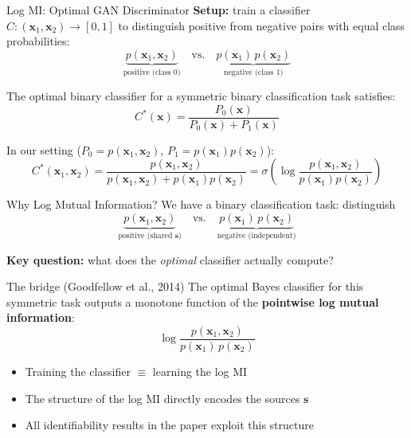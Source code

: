 \documentclass[aspectratio=169, 10pt]{beamer}
\begin{document}
\begin{frame}{Log MI: Optimal GAN Discriminator}
  \textbf{Setup:} train a classifier $C\colon(\mathbf{x}_1,\mathbf{x}_2)\to[0,1]$ to distinguish positive from
  negative pairs with equal class probabilities:
  \[
    \underbrace{p(\mathbf{x}_1,\mathbf{x}_2)}_{\text{positive (class 0)}}
    \quad\text{vs.}\quad
    \underbrace{p(\mathbf{x}_1)\,p(\mathbf{x}_2)}_{\text{negative (class 1)}}
  \]

  \bigskip
  \begin{theorem}
    The optimal binary classifier for a symmetric binary classification task satisfies:
    \[
      C^*(\mathbf{x}) = \frac{P_0(\mathbf{x})}{P_0(\mathbf{x}) + P_1(\mathbf{x})}
    \]
  \end{theorem}

  \medskip
  In our setting ($P_0 = p(\mathbf{x}_1,\mathbf{x}_2)$, $P_1 = p(\mathbf{x}_1)p(\mathbf{x}_2)$):
  \[
    C^*(\mathbf{x}_1,\mathbf{x}_2)
    = \frac{p(\mathbf{x}_1,\mathbf{x}_2)}{p(\mathbf{x}_1,\mathbf{x}_2)+p(\mathbf{x}_1)p(\mathbf{x}_2)}
    = \sigma\!\left(\log\frac{p(\mathbf{x}_1,\mathbf{x}_2)}{p(\mathbf{x}_1)p(\mathbf{x}_2)}\right)
  \]

\end{frame}

\begin{frame}{Why Log Mutual Information?}
  We have a binary classification task: distinguish
  \[
    \underbrace{p(\mathbf{x}_1,\mathbf{x}_2)}_{\text{positive (shared }\mathbf{s}\text{)}}
    \quad\text{vs.}\quad
    \underbrace{p(\mathbf{x}_1)\,p(\mathbf{x}_2)}_{\text{negative (independent)}}
  \]

  \bigskip
  \textbf{Key question:} what does the \emph{optimal} classifier actually compute?

  \bigskip
  \begin{block}{The bridge (Goodfellow et al., 2014)}
    The optimal Bayes classifier for this symmetric task outputs a monotone function of
    the \textbf{pointwise log mutual information}:
    \[
      \log \frac{p(\mathbf{x}_1,\mathbf{x}_2)}{p(\mathbf{x}_1)\,p(\mathbf{x}_2)}
    \]
  \end{block}

  \bigskip
  \begin{itemize}
    \item Training the classifier $\equiv$ learning the log MI
    \item The structure of the log MI directly encodes the sources $\mathbf{s}$
    \item All identifiability results in the paper exploit this structure
  \end{itemize}
\end{frame}
\end{document}
